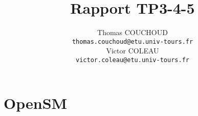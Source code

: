 \documentclass{report}
\title{Rapport TP3-4-5}
\author{Thomas COUCHOUD\\\texttt{thomas.couchoud@etu.univ-tours.fr}\\Victor COLEAU\\\texttt{victor.coleau@etu.univ-tours.fr}}
\begin{document}
	\mccTitle[no]
	\tableofcontents

	\chapter{OpenSM}
		
		
\end{document}
